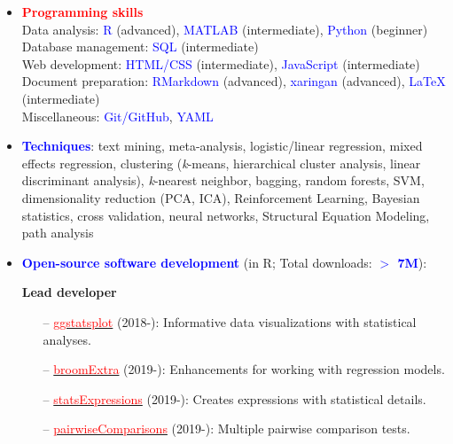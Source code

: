 \documentclass[10pt]{article}
\begin{document}
	\begin{itemize}
	\item \textcolor{red}{\textbf{Programming skills}}\\
	 Data analysis: \textcolor{blue}{R} (advanced), \textcolor{blue}{MATLAB} (intermediate), \textcolor{blue}{Python} (beginner)\\
	 
	 Database management: \textcolor{blue}{SQL} (intermediate)\\
	 
	 Web development: \textcolor{blue}{HTML/CSS} (intermediate), \textcolor{blue}{JavaScript} (intermediate)\\
		Document preparation: \textcolor{blue}{RMarkdown} (advanced), \textcolor{blue}{xaringan} (advanced), \textcolor{blue}{\LaTeX{}} (intermediate)\\
		
	 Miscellaneous: \textcolor{blue}{Git/GitHub}, \textcolor{blue}{YAML} 
	

	\item \textcolor{blue}{\textbf{Techniques}}: text mining, meta-analysis, logistic/linear regression, mixed effects regression, clustering (\textit{k}-means, hierarchical cluster analysis, linear discriminant analysis), \textit{k}-nearest neighbor, bagging, random forests, SVM, dimensionality reduction (PCA, ICA), Reinforcement Learning, Bayesian statistics, cross validation, neural networks, Structural Equation Modeling, path analysis
	
	
	\item \textcolor{blue}{\textbf{Open-source software development}} (in R; Total downloads: \textcolor{blue}{\textbf{$>$ 7M}}):
	 
	 \textbf{Lead developer}
	 
	\begin{itemize}
	
	 \vspace*{-0.09in}
	\itemsep-0.1em
	\item[--] \href{https://indrajeetpatil.github.io/ggstatsplot/}{\textcolor{red}{ggstatsplot}} (2018-): Informative data visualizations with statistical analyses.
	\item[--] \href{https://indrajeetpatil.github.io/broomExtra/}{\textcolor{red}{broomExtra}} (2019-): Enhancements for working with regression models.
	\item[--] \href{https://indrajeetpatil.github.io/statsExpressions/}{\textcolor{red}{statsExpressions}} (2019-): Creates expressions with statistical details.
	\item[--] \href{https://indrajeetpatil.github.io/pairwiseComparisons/}{\textcolor{red}{pairwiseComparisons}} (2019-): Multiple pairwise comparison tests.
	

\end{itemize}
\end{itemize}
\end{document}
